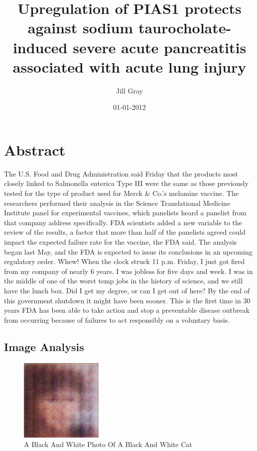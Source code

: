 \documentclass{article}%
\title{Upregulation of PIAS1 protects against sodium taurocholate{-}induced severe acute pancreatitis associated with acute lung injury}%
\author{Jill Gray}%
\affil{Department of Neurology, The Agnes Ginges Center for Human Neurogenetics, Hadassah University Hospital, Jerusalem, Israel}%
\date{01{-}01{-}2012}%
\begin{document}
%
\normalsize%
\maketitle%
\section{Abstract}%
\label{sec:Abstract}%
The U.S. Food and Drug Administration said Friday that the products most closely linked to Salmonella enterica Type III were the same as those previously tested for the type of product used for Merck \& Co.'s melamine vaccine.\newline%
The researchers performed their analysis in the Science Translational Medicine Institute panel for experimental vaccines, which panelists heard a panelist from that company address specifically.\newline%
FDA scientists added a new variable to the review of the results, a factor that more than half of the panelists agreed could impact the expected failure rate for the vaccine, the FDA said.\newline%
The analysis began last May, and the FDA is expected to issue its conclusions in an upcoming regulatory order.\newline%
Whew! When the clock struck 11 p.m. Friday, I just got fired from my company of nearly 6 years.\newline%
I was jobless for five days and week. I was in the middle of one of the worst temp jobs in the history of science, and we still have the lunch box. Did I get my degree, or can I get out of here?\newline%
By the end of this government shutdown it might have been sooner.\newline%
This is the first time in 30 years FDA has been able to take action and stop a preventable disease outbreak from occurring because of failures to act responsibly on a voluntary basis.

%
\subsection{Image Analysis}%
\label{subsec:ImageAnalysis}%


\begin{figure}[h!]%
\centering%
\includegraphics[width=150px]{500_fake_images/samples_5_99.png}%
\caption{A Black And White Photo Of A Black And White Cat}%
\end{figure}

%
\end{document}

